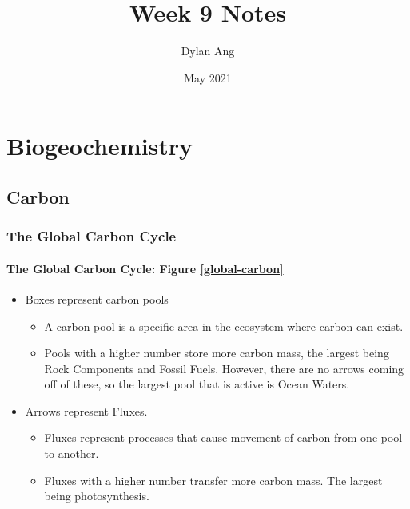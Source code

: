\documentclass[12pt]{article}
\title{Week 9 Notes}
\author{Dylan Ang}
\date{May 2021}
\begin{document}
\maketitle

\tableofcontents


\section{Biogeochemistry}

\subsection{Carbon}

\subsubsection{The Global Carbon Cycle}


\paragraph{The Global Carbon Cycle: Figure \ref{global-carbon}}
\begin{itemize}
    \item Boxes represent carbon pools
          \begin{itemize}
              \item A carbon pool is a specific area in the ecosystem where carbon can exist.
              \item Pools with a higher number store more carbon mass, the largest being Rock Components and Fossil Fuels. However, there are no arrows coming off of these, so the largest pool that is active is Ocean Waters.
          \end{itemize}
    \item Arrows represent Fluxes.
          \begin{itemize}
              \item Fluxes represent processes that cause movement of carbon from one pool to another.
              \item Fluxes with a higher number transfer more carbon mass. The largest being photosynthesis.
          \end{itemize}
\end{itemize}
\end{document}
